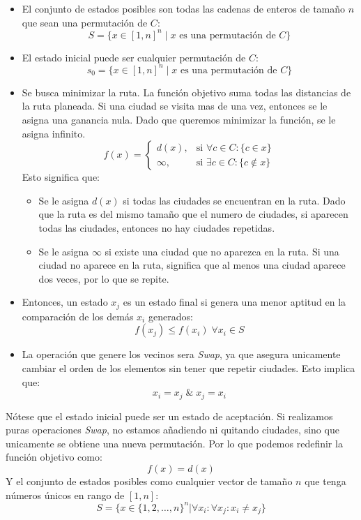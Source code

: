 \documentclass[12pt,twoside]{article}
\begin{document}
	\begin{itemize}
		\item El conjunto de estados posibles son todas las cadenas de enteros de tamaño $n$ que sean una permutación de $C$: \[ S = \{ x \in [1, n]^n \;|\; x \text{ es una permutación de } C \} \]
		
		\item El estado inicial puede ser cualquier permutación de $C$: 
		\[ s_0 = \{ x \in [1, n]^n \;|\; x \text{ es una permutación de } C \} \]
		
		\item Se busca minimizar la ruta. La función objetivo suma todas las distancias de la ruta planeada. Si una ciudad se visita mas de una vez, entonces se le asigna una ganancia nula. Dado que queremos minimizar la función, se le asigna infinito.
		\[
		f(x) =
		\begin{cases} 
			d(x), & \text{si } \forall c \in C \colon \{ c \in x \} \\ 
			\infty, & \text{si } \exists c \in C \colon \{c \notin x\}
		\end{cases}
		\]
		Esto significa que:
		\begin{itemize}
			\item Se le asigna $d(x)$ si todas las ciudades se encuentran en la ruta. Dado que la ruta es del mismo tamaño que el numero de ciudades, si aparecen todas las ciudades, entonces no hay ciudades repetidas.
			\item Se le asigna $\infty$ si existe una ciudad que no aparezca en la ruta. Si una ciudad no aparece en la ruta, significa que al menos una ciudad aparece dos veces, por lo que se repite.
		\end{itemize}
		
		\item Entonces, un estado $x_j$ es un estado final si genera una menor aptitud en la comparación de los demás $x_i$ generados: \[ f(x_j) \leq f(x_i) \; \forall x_i \in S \]
		
		\item La operación que genere los vecinos sera \textit{Swap}, ya que asegura unicamente cambiar el orden de los elementos sin tener que repetir ciudades. Esto implica que: \[ x_i = x_j \; \&  \; x_j = x_i \]
		
	\end{itemize}
	
	
	
	Nótese que el estado inicial puede ser un estado de aceptación. Si realizamos puras operaciones \textit{Swap}, no estamos añadiendo ni quitando ciudades, sino que unicamente se obtiene una nueva permutación. Por lo que podemos redefinir la función objetivo como: \[ f(x) = d(x) \] Y el conjunto de estados posibles como cualquier vector de tamaño $n$ que tenga números únicos en rango de $[1,n]$: \[ S = \{ x \in \{1, 2, \dots, n  \}^n | \forall x_i \colon \forall x_j \colon x_i \neq x_j \}\]
	
\end{document}
